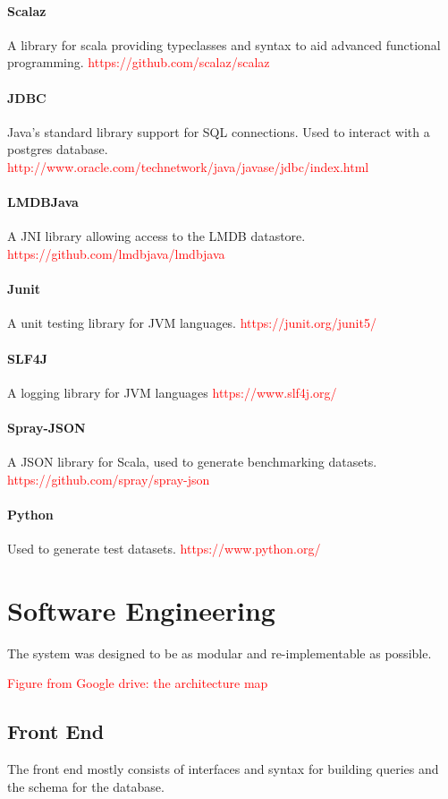 \documentclass[12pt,a4paper,twoside,openright]{report}
\newcommand\todo[1]{\textcolor{red}{#1}}
\begin{document}
\paragraph{Scalaz} A library for scala providing typeclasses and syntax to aid advanced functional programming. \todo{https://github.com/scalaz/scalaz}
\paragraph{JDBC} Java’s standard library support for SQL connections. Used to interact with a postgres database.
\todo{http://www.oracle.com/technetwork/java/javase/jdbc/index.html}
\paragraph{LMDBJava} A JNI library allowing access to the LMDB datastore. 
\todo{https://github.com/lmdbjava/lmdbjava}
\paragraph{Junit} A unit testing library for JVM languages.
\todo{https://junit.org/junit5/}
\paragraph{SLF4J} A logging library for JVM languages
\todo{https://www.slf4j.org/}
\paragraph{Spray-JSON} A JSON library for Scala, used to generate benchmarking datasets.
\todo{https://github.com/spray/spray-json}
\paragraph{Python} Used to generate test datasets.
\todo{https://www.python.org/}


\section{Software Engineering}
The system was designed to be as modular and re-implementable as possible.

\todo{Figure from Google drive: the architecture map}
\subsection{Front End}
The front end mostly consists of interfaces and syntax for building queries and the schema for the database.
\end{document}
